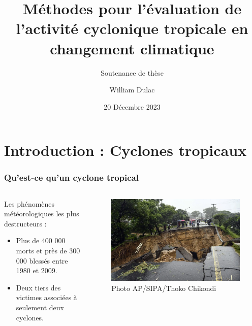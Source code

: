 \documentclass[aspectratio=169, usepdftitle=false, xcolor={dvipsnames}, 9pt]{beamer}
\title{Méthodes pour l'évaluation de l'activité cyclonique tropicale en changement climatique}
\author[William]{William Dulac}
\subtitle{Soutenance de thèse}
\institute{Centre National de Recherches Météorologiques}
\date{20 Décembre 2023}
\begin{document}
\maketitle

\section[Introduction]{Introduction : Cyclones tropicaux}

\begin{frame}[c]
    \frametitle{Qu'est-ce qu'un cyclone tropical}
    \begin{columns}
        \begin{column}{0.45\textwidth}
            \begin{definition}
                Les phénomènes météorologiques les plus destructeurs :
                \tcblower
                \begin{itemize}
                    \item Plus de 400 000 morts et près de 300 000 blessés entre 1980 et 2009.
                    \item Deux tiers des victimes associées à seulement deux cyclones.
                \end{itemize} 
            \end{definition}
        \end{column}
        \begin{column}{0.45\textwidth}
             \begin{figure}[htpb]
                 \centering
                 \includegraphics[width=\textwidth]{Figures/freddy_malawi_route.png}
                 \caption{Photo AP/SIPA/Thoko Chikondi}
             \end{figure}
        \end{column}
    \end{columns}
\end{frame}
\end{document}
